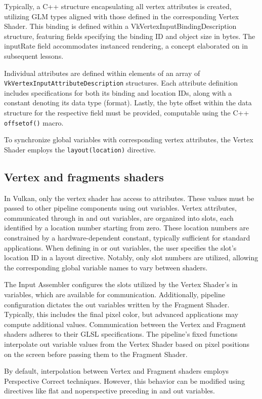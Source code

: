 Typically, a C++ structure encapsulating all vertex attributes is created, utilizing GLM types aligned with those defined in the corresponding Vertex Shader. 
This binding is defined within a VkVertexInputBindingDescription structure, featuring fields specifying the binding ID and object size in bytes.
The inputRate field accommodates instanced rendering, a concept elaborated on in subsequent lessons.

Individual attributes are defined within elements of an array of \texttt{VkVertexInputAttributeDescription} structures. 
Each attribute definition includes specifications for both its binding and location IDs, along with a constant denoting its data type (format). 
Lastly, the byte offset within the data structure for the respective field must be provided, computable using the C++ \texttt{offsetof()} macro.

To synchronize global variables with corresponding vertex attributes, the Vertex Shader employs the \texttt{layout(location)} directive.

\subsection{Vertex and fragments shaders}
In Vulkan, only the vertex shader has access to attributes. These values must be passed to other pipeline components using out variables. 
Vertex attributes, communicated through in and out variables, are organized into slots, each identified by a location number starting from zero. 
These location numbers are constrained by a hardware-dependent constant, typically sufficient for standard applications. 
When defining in or out variables, the user specifies the slot's location ID in a layout directive. 
Notably, only slot numbers are utilized, allowing the corresponding global variable names to vary between shaders.

The Input Assembler configures the slots utilized by the Vertex Shader's in variables, which are available for communication. 
Additionally, pipeline configuration dictates the out variables written by the Fragment Shader. 
Typically, this includes the final pixel color, but advanced applications may compute additional values. 
Communication between the Vertex and Fragment shaders adheres to their GLSL specifications. 
The pipeline's fixed functions interpolate out variable values from the Vertex Shader based on pixel positions on the screen before passing them to the Fragment Shader.

By default, interpolation between Vertex and Fragment shaders employs Perspective Correct techniques.
However, this behavior can be modified using directives like flat and noperspective preceding in and out variables.






